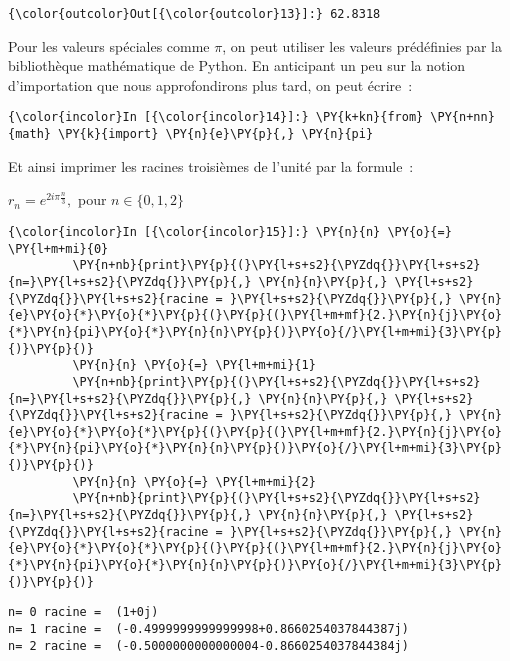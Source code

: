 \begin{Verbatim}[commandchars=\\\{\}]
{\color{outcolor}Out[{\color{outcolor}13}]:} 62.8318
\end{Verbatim}
            
    Pour les valeurs spéciales comme \(\pi\), on peut utiliser les valeurs
prédéfinies par la bibliothèque mathématique de Python. En anticipant un
peu sur la notion d'importation que nous approfondirons plus tard, on
peut écrire~:

    \begin{Verbatim}[commandchars=\\\{\}]
{\color{incolor}In [{\color{incolor}14}]:} \PY{k+kn}{from} \PY{n+nn}{math} \PY{k}{import} \PY{n}{e}\PY{p}{,} \PY{n}{pi}
\end{Verbatim}


    Et ainsi imprimer les racines troisièmes de l'unité par la formule~:

\(r_n = e^{2i\pi \frac{n}{3}},\) pour \(n\in \{0,1,2\}\)

    \begin{Verbatim}[commandchars=\\\{\}]
{\color{incolor}In [{\color{incolor}15}]:} \PY{n}{n} \PY{o}{=} \PY{l+m+mi}{0}
         \PY{n+nb}{print}\PY{p}{(}\PY{l+s+s2}{\PYZdq{}}\PY{l+s+s2}{n=}\PY{l+s+s2}{\PYZdq{}}\PY{p}{,} \PY{n}{n}\PY{p}{,} \PY{l+s+s2}{\PYZdq{}}\PY{l+s+s2}{racine = }\PY{l+s+s2}{\PYZdq{}}\PY{p}{,} \PY{n}{e}\PY{o}{*}\PY{o}{*}\PY{p}{(}\PY{p}{(}\PY{l+m+mf}{2.}\PY{n}{j}\PY{o}{*}\PY{n}{pi}\PY{o}{*}\PY{n}{n}\PY{p}{)}\PY{o}{/}\PY{l+m+mi}{3}\PY{p}{)}\PY{p}{)}
         \PY{n}{n} \PY{o}{=} \PY{l+m+mi}{1}
         \PY{n+nb}{print}\PY{p}{(}\PY{l+s+s2}{\PYZdq{}}\PY{l+s+s2}{n=}\PY{l+s+s2}{\PYZdq{}}\PY{p}{,} \PY{n}{n}\PY{p}{,} \PY{l+s+s2}{\PYZdq{}}\PY{l+s+s2}{racine = }\PY{l+s+s2}{\PYZdq{}}\PY{p}{,} \PY{n}{e}\PY{o}{*}\PY{o}{*}\PY{p}{(}\PY{p}{(}\PY{l+m+mf}{2.}\PY{n}{j}\PY{o}{*}\PY{n}{pi}\PY{o}{*}\PY{n}{n}\PY{p}{)}\PY{o}{/}\PY{l+m+mi}{3}\PY{p}{)}\PY{p}{)}
         \PY{n}{n} \PY{o}{=} \PY{l+m+mi}{2}
         \PY{n+nb}{print}\PY{p}{(}\PY{l+s+s2}{\PYZdq{}}\PY{l+s+s2}{n=}\PY{l+s+s2}{\PYZdq{}}\PY{p}{,} \PY{n}{n}\PY{p}{,} \PY{l+s+s2}{\PYZdq{}}\PY{l+s+s2}{racine = }\PY{l+s+s2}{\PYZdq{}}\PY{p}{,} \PY{n}{e}\PY{o}{*}\PY{o}{*}\PY{p}{(}\PY{p}{(}\PY{l+m+mf}{2.}\PY{n}{j}\PY{o}{*}\PY{n}{pi}\PY{o}{*}\PY{n}{n}\PY{p}{)}\PY{o}{/}\PY{l+m+mi}{3}\PY{p}{)}\PY{p}{)}
\end{Verbatim}


    \begin{Verbatim}[commandchars=\\\{\}]
n= 0 racine =  (1+0j)
n= 1 racine =  (-0.4999999999999998+0.8660254037844387j)
n= 2 racine =  (-0.5000000000000004-0.8660254037844384j)

    \end{Verbatim}

